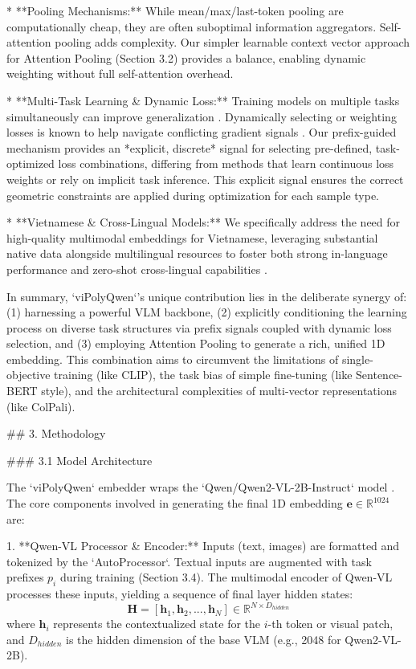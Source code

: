 *   **Pooling Mechanisms:** While mean/max/last-token pooling are computationally cheap, they are often suboptimal information aggregators. Self-attention pooling \cite{lin2017structured} adds complexity. Our simpler learnable context vector approach for Attention Pooling (Section 3.2) provides a balance, enabling dynamic weighting without full self-attention overhead.

*   **Multi-Task Learning & Dynamic Loss:** Training models on multiple tasks simultaneously can improve generalization \cite{caruana1997multitask}. Dynamically selecting or weighting losses is known to help navigate conflicting gradient signals \cite{kendall2018multi, chen2018gradnorm}. Our prefix-guided mechanism provides an *explicit, discrete* signal for selecting pre-defined, task-optimized loss combinations, differing from methods that learn continuous loss weights or rely on implicit task inference. This explicit signal ensures the correct geometric constraints are applied during optimization for each sample type.

*   **Vietnamese & Cross-Lingual Models:** We specifically address the need for high-quality multimodal embeddings for Vietnamese, leveraging substantial native data alongside multilingual resources to foster both strong in-language performance and zero-shot cross-lingual capabilities \cite{conneau2019unsupervised}.

In summary, `viPolyQwen`'s unique contribution lies in the deliberate synergy of: (1) harnessing a powerful VLM backbone, (2) explicitly conditioning the learning process on diverse task structures via prefix signals coupled with dynamic loss selection, and (3) employing Attention Pooling to generate a rich, unified 1D embedding. This combination aims to circumvent the limitations of single-objective training (like CLIP), the task bias of simple fine-tuning (like Sentence-BERT style), and the architectural complexities of multi-vector representations (like ColPali).

## 3. Methodology

### 3.1 Model Architecture

The `viPolyQwen` embedder wraps the `Qwen/Qwen2-VL-2B-Instruct` model \cite{bai2023qwen}. The core components involved in generating the final 1D embedding $\mathbf{e} \in \mathbb{R}^{1024}$ are:

1.  **Qwen-VL Processor & Encoder:** Inputs (text, images) are formatted and tokenized by the `AutoProcessor`. Textual inputs are augmented with task prefixes $p_i$ during training (Section 3.4). The multimodal encoder of Qwen-VL processes these inputs, yielding a sequence of final layer hidden states:
    $$ \mathbf{H} = [\mathbf{h}_1, \mathbf{h}_2, ..., \mathbf{h}_N] \in \mathbb{R}^{N \times D_{hidden}} $$
    where $\mathbf{h}_i$ represents the contextualized state for the $i$-th token or visual patch, and $D_{hidden}$ is the hidden dimension of the base VLM (e.g., 2048 for Qwen2-VL-2B).

